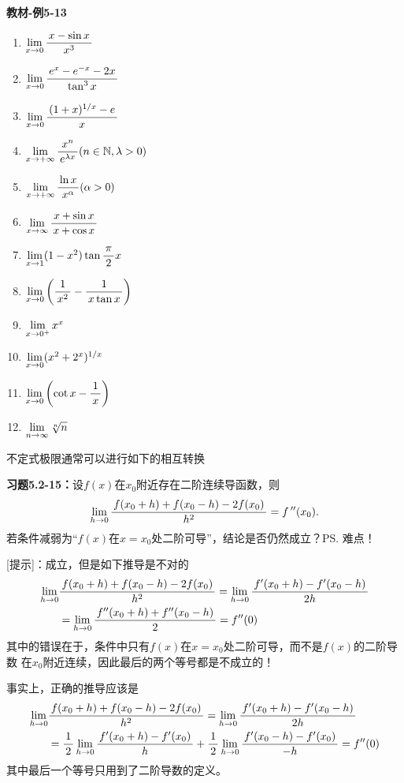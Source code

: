 {\bf 教材-例5-13}
\begin{enumerate}[(1)]
  \setlength{\itemindent}{1cm}
  \item $\lim\limits_{x\to{0}}\displaystyle\frac{\,{x-\sin x}\,}{\,{x^3}\,}$ 
  \item $\lim\limits_{x\to{0}}\displaystyle\frac{\,{e^x-e^{-x}-2x}\,}{\,{\tan^3x}\,}$ 
  \item $\lim\limits_{x\to{0}}\displaystyle\frac{\,{(1+x)^{1/x}-e}\,}{\,{x}\,}$ 
  \item $\lim\limits_{x\to{+\infty}}\displaystyle\frac{\,{x^n}\,}{\,{e^{\lambda
  x}}\,}(n\in\mathbb{N},\lambda>0)$ 
  \item $\lim\limits_{x\to{+\infty}}\displaystyle\frac{\,{\ln x}\,}{\,{x^\alpha}\,}(\alpha>0)$ 
  \item $\lim\limits_{x\to{\infty}}\displaystyle\frac{\,{x+\sin x}\,}{\,{x+\cos x}\,}$
  \item $\lim\limits_{x\to{1}}(1-x^2)\tan\displaystyle\frac{\,{\pi}\,}{\,{2}\,}x$ 
  \item $\lim\limits_{x\to{0}}\left(\displaystyle\frac{\,{1}\,}{\,{x^2}\,}-\displaystyle\frac{\,{1}\,}{\,{x\tan x}\,}\right)$ 
  \item $\lim\limits_{x\to{0^+}}x^x$
  \item $\lim\limits_{x\to{0}}(x^2+2^x)^{1/x}$ 
  \item $\lim\limits_{x\to{0}}\left(\cot x-\displaystyle\frac{\,{1}\,}{\,{x}\,}\right)$ 
  \item $\lim\limits_{n\to\infty}\sqrt[n]n$
\end{enumerate}

不定式极限通常可以进行如下的相互转换

\begin{center}
\end{center}

{\b{\bf 习题5.2-15：}设$f(x)$在$x_0$附近存在二阶连续导函数，则
$$\lim\limits_{h\to 0}\displaystyle\frac{\,{f(x_0+h)+f(x_0-h)-2f(x_0)}\,}{\,{h^2}\,}=f\,''(x_0).$$
若条件减弱为“$f(x)$在$x=x_0$处二阶可导”，结论是否仍然成立？\ps{难点！}

[提示]：成立，但是如下推导是不对的
\begin{align}
	\lim\limits_{h\to 0}&\displaystyle\frac{\,{f(x_0+h)+f(x_0-h)-2f(x_0)}\,}{\,{h^2}\,}
	=\lim\limits_{h\to 0}\displaystyle\frac{\,{f'(x_0+h)-f'(x_0-h)}\,}{\,{2h}\,}\notag\\
	&=\lim\limits_{h\to 0}\displaystyle\frac{\,{f''(x_0+h)+f''(x_0-h)}\,}{\,{2}\,}
	=f''(0)\notag
\end{align}
其中的错误在于，条件中只有$f(x)$在$x=x_0$处二阶可导，而不是$f(x)$的二阶导数
在$x_0$附近连续，因此最后的两个等号都是不成立的！

事实上，正确的推导应该是
\begin{align}
	\lim\limits_{h\to 0}&\displaystyle\frac{\,{f(x_0+h)+f(x_0-h)-2f(x_0)}\,}{\,{h^2}\,}
	=\lim\limits_{h\to 0}\displaystyle\frac{\,{f'(x_0+h)-f'(x_0-h)}\,}{\,{2h}\,}\notag\\
	&=\displaystyle\frac{\,{1}\,}{\,{2}\,}\lim\limits_{h\to 0}\displaystyle\frac{\,{f'(x_0+h)-f'(x_0)}\,}{\,{h}\,}
	+\displaystyle\frac{\,{1}\,}{\,{2}\,}\lim\limits_{h\to 0}\displaystyle\frac{\,{f'(x_0-h)-f'(x_0)}\,}{\,{-h}\,}
	=f''(0)\notag
\end{align}
其中最后一个等号只用到了二阶导数的定义。}

